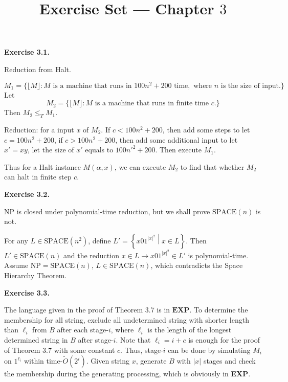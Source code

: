 \documentclass[a4paper]{article}
\title{Exercise Set --- Chapter $3$}
\date{}
\newenvironment{exercise}[1]{
	\par
	\noindent\textbf{Exercise #1.}\quad
}{
	\par
	\bigskip
}
\newcommand{\cbra}[1]{\left\{ #1 \right\}}
\begin{document}
\maketitle


\begin{exercise}{3.1}
Reduction from Halt.

$$M_{1}=\{\lfloor M \rfloor : M \text{ is a machine that runs in } 100n^{2} + 200 \text{ time}, \text{ where } n\text{ is the size of input.}\}$$
Let $$M_{2} = \{\lfloor M \rfloor : M \text{ is a machine that runs in finite time }c.\}$$
 Then $M_{2}\leq_{T} M_{1}$.

Reduction: for a input $x$ of $M_{2}$. If $c< 100n^{2} + 200$, then add some steps to let $c = 100n^{2} + 200$, if $c > 100n^{2} + 200$, then add some additional input to let $x'=xy$, let the size of $x'$ equals to $100n'^{2} + 200$. Then execute $M_{1}$. 

Thus for a Halt instance $M(\alpha, x)$, we can execute $M_{2}$ to find that whether $M_{2}$ can halt in finite step $c$.
\end{exercise}


\begin{exercise}{3.2}
    NP is closed under polynomial-time reduction, but we shall prove $\text{SPACE}(n)$ is not.

    For any $L\in\text{SPACE}(n^2)$, define $L'=\cbra{x01^{|x|^2}\middle| x\in L}$.
    Then $L'\in\text{SPACE}(n)$ and the reduction $x\in L\to x01^{|x|^2}\in L'$ is polynomial-time.
    Assume $\text{NP}=\text{SPACE}(n)$, $L\in\text{SPACE}(n)$, which contradicts the Space Hierarchy Theorem.
\end{exercise}

\begin{exercise}{3.3}
    The language given in the proof of Theorem 3.7 is in $\textbf{EXP}$. To determine the membership for all string, exclude all undetermined string with shorter length than $\ell_i$ from $B$ after each stage-$i$, where $\ell_i$ is the length of the longest determined string in $B$ after stage-$i$. Note that $\ell_i = i + c$ is enough for the proof of Theorem 3.7 with some constant $c$. Thus, stage-$i$ can be done by simulating $M_i$ on $1^{\ell_i}$ within time-$\tilde O(2^i)$. Given string $x$, generate $B$ with $|x|$ stages and check the membership during the generating processing, which is obviously in \textbf{EXP}.
\end{exercise}
\end{document}
